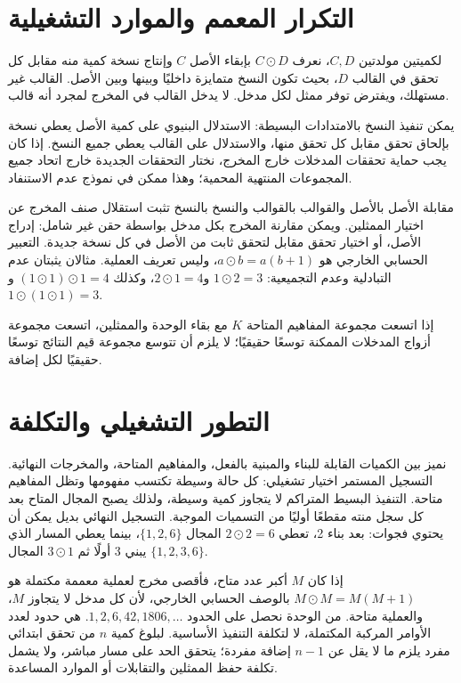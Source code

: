 \documentclass[12pt,a4paper]{article}
\begin{document}
\section{التكرار المعمم والموارد التشغيلية}
لكميتين مولدتين $C,D$، نعرف $C\odot D$ بإبقاء الأصل $C$ وإنتاج نسخة كمية منه مقابل كل تحقق في القالب $D$، بحيث تكون النسخ متمايزة داخليًا وبينها وبين الأصل. القالب غير مستهلك، ويفترض توفر ممثل لكل مدخل. لا يدخل القالب في المخرج لمجرد أنه قالب.

يمكن تنفيذ النسخ بالامتدادات البسيطة: الاستدلال البنيوي على كمية الأصل يعطي نسخة بإلحاق تحقق مقابل كل تحقق منها، والاستدلال على القالب يعطي جميع النسخ. إذا كان يجب حماية تحققات المدخلات خارج المخرج، نختار التحققات الجديدة خارج اتحاد جميع المجموعات المنتهية المحمية؛ وهذا ممكن في نموذج عدم الاستنفاد.

مقابلة الأصل بالأصل والقوالب بالقوالب والنسخ بالنسخ تثبت استقلال صنف المخرج عن اختيار الممثلين. ويمكن مقارنة المخرج بكل مدخل بواسطة حقن غير شامل: إدراج الأصل، أو اختيار تحقق مقابل لتحقق ثابت من الأصل في كل نسخة جديدة. التعبير الحسابي الخارجي هو $a\odot b=a(b+1)$، وليس تعريف العملية. مثالان يثبتان عدم التبادلية وعدم التجميعية: $1\odot2=3$ و$2\odot1=4$، وكذلك $(1\odot1)\odot1=4$ و$1\odot(1\odot1)=3$.

إذا اتسعت مجموعة المفاهيم المتاحة $K$ مع بقاء الوحدة والممثلين، اتسعت مجموعة أزواج المدخلات الممكنة توسعًا حقيقيًا؛ لا يلزم أن تتوسع مجموعة قيم النتائج توسعًا حقيقيًا لكل إضافة.

\section{التطور التشغيلي والتكلفة}
نميز بين الكميات القابلة للبناء والمبنية بالفعل، والمفاهيم المتاحة، والمخرجات النهائية. التسجيل المستمر اختيار تشغيلي: كل حالة وسيطة تكتسب مفهومها وتظل المفاهيم متاحة. التنفيذ البسيط المتراكم لا يتجاوز كمية وسيطة، ولذلك يصبح المجال المتاح بعد كل سجل منته مقطعًا أوليًا من التسميات الموجبة. التسجيل النهائي بديل يمكن أن يحتوي فجوات: بعد بناء 2، تعطي $2\odot2=6$ المجال $\{1,2,6\}$، بينما يعطي المسار الذي يبني 3 أولًا ثم $3\odot1$ المجال $\{1,2,3,6\}$.

إذا كان $M$ أكبر عدد متاح، فأقصى مخرج لعملية معممة مكتملة هو $M\odot M=M(M+1)$ بالوصف الحسابي الخارجي، لأن كل مدخل لا يتجاوز $M$، والعملية متاحة. من الوحدة نحصل على الحدود $1,2,6,42,1806,\ldots$. هي حدود لعدد الأوامر المركبة المكتملة، لا لتكلفة التنفيذ الأساسية. لبلوغ كمية $n$ من تحقق ابتدائي مفرد يلزم ما لا يقل عن $n-1$ إضافة مفردة؛ يتحقق الحد على مسار مباشر، ولا يشمل تكلفة حفظ الممثلين والتقابلات أو الموارد المساعدة.
\end{document}
